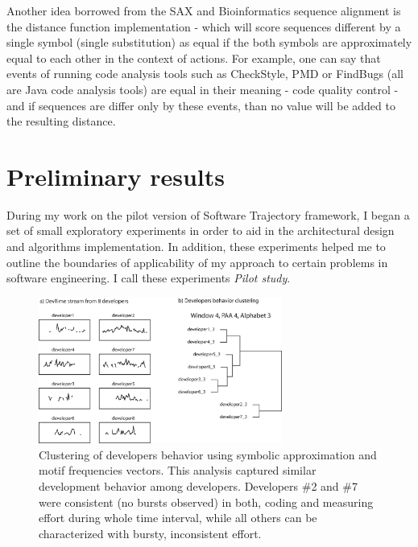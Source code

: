 \documentclass{sig-alternate}
\begin{document}
Another idea borrowed from the SAX and Bioinformatics sequence alignment is the distance function implementation - which will score sequences different by a single symbol (single substitution) as equal if the both symbols are approximately equal to each other in the context of actions. For example, one can say that events of running code analysis tools such as CheckStyle, PMD or FindBugs (all are Java code analysis tools) are equal in their meaning - code quality control - and if sequences are differ only by these events, than no value will be added to the resulting distance.

\section{Preliminary results}
During my work on the pilot version of Software Trajectory framework, I began a set of small exploratory experiments in order to aid in the architectural design and algorithms implementation. In addition, these experiments helped me to outline the boundaries of applicability of my approach to certain problems in software engineering. I call these experiments \textit{Pilot study}.

\begin{figure}[tbp]
   \centering
   \includegraphics[height=48mm]{dev_clustering.eps}
   \caption{Clustering of developers behavior using symbolic approximation and motif frequencies vectors. This analysis captured similar development behavior among developers. Developers \#2 and \#7 were consistent (no bursts observed) in both, coding and measuring effort during whole time interval, while all others can be characterized with bursty, inconsistent effort.}
   \label{fig:cluster_developers}
\end{figure}
\end{document}
